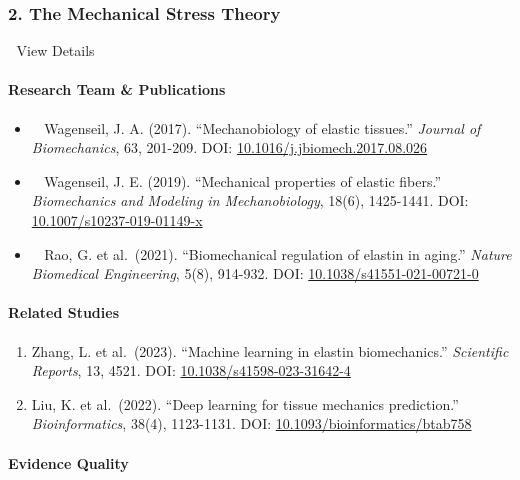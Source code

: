 \subsubsection{2. The Mechanical Stress
Theory}\label{the-mechanical-stress-theory}

🔄 View Details

\paragraph{Research Team \&
Publications}\label{research-team-publications}

\begin{itemize}
\item
  👨‍🔬 Wagenseil, J. A. (2017). ``Mechanobiology of elastic tissues.''
  \emph{Journal of Biomechanics}, 63, 201-209. DOI:
  \href{https://doi.org/10.1016/j.jbiomech.2017.08.026}{10.1016/j.jbiomech.2017.08.026}
\item
  👩‍🔬 Wagenseil, J. E. (2019). ``Mechanical properties of elastic
  fibers.'' \emph{Biomechanics and Modeling in Mechanobiology}, 18(6),
  1425-1441. DOI:
  \href{https://doi.org/10.1007/s10237-019-01149-x}{10.1007/s10237-019-01149-x}
\item
  👨‍🔬 Rao, G. et al.~(2021). ``Biomechanical regulation of elastin in
  aging.'' \emph{Nature Biomedical Engineering}, 5(8), 914-932. DOI:
  \href{https://doi.org/10.1038/s41551-021-00721-0}{10.1038/s41551-021-00721-0}
\end{itemize}

\paragraph{Related Studies}\label{related-studies}

\begin{enumerate}
\def\labelenumi{\arabic{enumi}.}
\item
  Zhang, L. et al.~(2023). ``Machine learning in elastin biomechanics.''
  \emph{Scientific Reports}, 13, 4521. DOI:
  \href{https://doi.org/10.1038/s41598-023-31642-4}{10.1038/s41598-023-31642-4}
\item
  Liu, K. et al.~(2022). ``Deep learning for tissue mechanics
  prediction.'' \emph{Bioinformatics}, 38(4), 1123-1131. DOI:
  \href{https://doi.org/10.1093/bioinformatics/btab758}{10.1093/bioinformatics/btab758}
\end{enumerate}

\paragraph{Evidence Quality}\label{evidence-quality}

